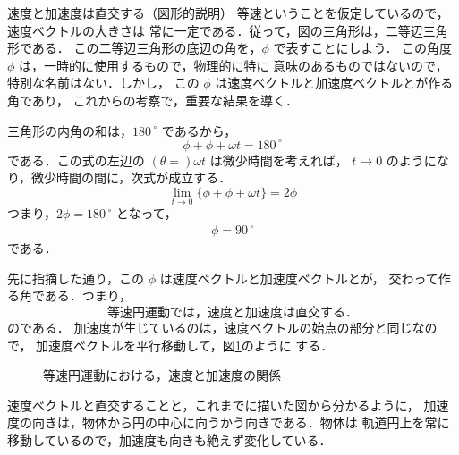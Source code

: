                 \begin{memo}{速度と加速度は直交する（図形的説明）}
                    等速ということを仮定しているので，速度ベクトルの大きさは
                    常に一定である．従って，図の三角形は，二等辺三角形である．
                    この二等辺三角形の底辺の角を，$\phi$ で表すことにしよう．
                    この角度 $\phi$ は，一時的に使用するもので，物理的に特に
                    意味のあるものではないので，特別な名前はない．しかし，
                    この $\phi$ は速度ベクトルと加速度ベクトルとが作る角であり，
                    これからの考察で，重要な結果を導く．

                    三角形の内角の和は，${180\,}^{\circ}$ であるから，
                        \begin{equation*}
                            \phi + \phi + \omega t = {180\,}^{\circ}
                        \end{equation*}
                    である．この式の左辺の $(\theta =) \omega t$ は微少時間を考えれば，
                    $t\rightarrow 0$ のようになり，微少時間の間に，次式が成立する．
                        \begin{equation*}
                            \lim_{t\rightarrow 0} \{\phi + \phi + \omega t\} = 2\phi
                        \end{equation*}
                    つまり，$2\phi = {180\,}^{\circ}$ となって，
                        \begin{align}
                            \phi = {90\,}^{\circ}
                        \end{align}
                    である．

                    先に指摘した通り，この $\phi$ は速度ベクトルと加速度ベクトルとが，
                    交わって作る角である．つまり，
                        \begin{equation*}
                            \mbox{等速円運動では，速度と加速度は直交する．}
                        \end{equation*}
                    のである．
                    加速度が生じているのは，速度ベクトルの始点の部分と同じなので，
                    加速度ベクトルを平行移動して，図\ref{fig:enundo_sokudo_kasokudo}のように
                    する．
                            \begin{figure}[hbt]
                                \begin{center}
                                    \caption{等速円運動における，速度と加速度の関係}
                                    \label{fig:enundo_sokudo_kasokudo}
                                \end{center}
                            \end{figure}

                    速度ベクトルと直交することと，これまでに描いた図から分かるように，
                    加速度の向きは，物体から円の中心に向うかう向きである．物体は
                    軌道円上を常に移動しているので，加速度も向きも絶えず変化している．
                \end{memo}


